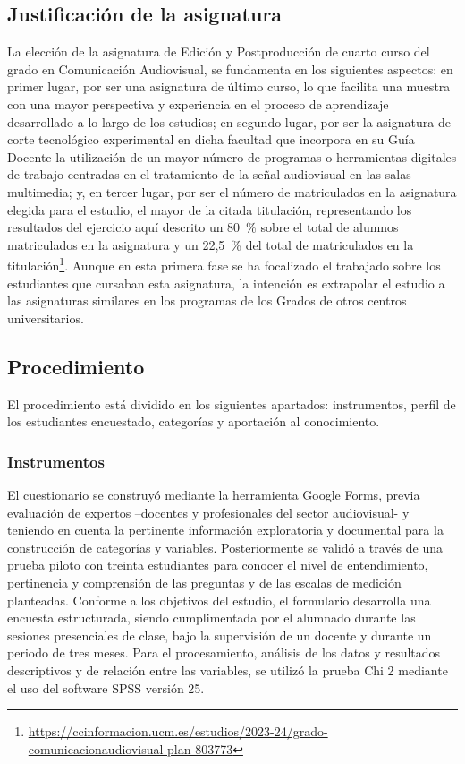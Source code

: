 \documentclass[spanish]{textolivre}
\begin{document}
\subsection{Justificación de la asignatura}\label{sec-fmt-manuscrito}
La elección de la asignatura de Edición y Postproducción de cuarto curso del grado en Comunicación Audiovisual, se fundamenta en los siguientes aspectos: en primer lugar, por ser una asignatura de último curso, lo que facilita una muestra con una mayor perspectiva y experiencia en el proceso de aprendizaje desarrollado a lo largo de los estudios; en segundo lugar, por ser la asignatura de corte tecnológico experimental en dicha facultad que incorpora en su Guía Docente la utilización de un mayor número de programas o herramientas digitales de trabajo centradas en el tratamiento de la señal audiovisual en las salas multimedia; y, en tercer lugar, por ser el número de matriculados en la asignatura elegida para el estudio, el mayor de la citada titulación, representando los resultados del ejercicio aquí descrito un 80~\% sobre el total de alumnos matriculados en la asignatura y un 22,5~\% del total de matriculados en la titulación\footnote{\url{https://ccinformacion.ucm.es/estudios/2023-24/grado-comunicacionaudiovisual-plan-803773}}. Aunque en esta primera fase se ha focalizado el trabajado sobre los estudiantes que cursaban esta asignatura, la intención es extrapolar el estudio a las asignaturas similares en los programas de los Grados de otros centros universitarios.


\subsection{Procedimiento}\label{sec-formato}
El procedimiento está dividido en los siguientes apartados: instrumentos, perfil de los estudiantes encuestado, categorías y aportación al conocimiento. 


\subsubsection{Instrumentos}\label{sec-modelo}
El cuestionario se construyó mediante la herramienta Google Forms, previa evaluación de expertos –docentes y profesionales del sector audiovisual- y teniendo en cuenta la pertinente información exploratoria y documental para la construcción de categorías y variables. Posteriormente se validó a través de una prueba piloto con treinta estudiantes para conocer el nivel de entendimiento, pertinencia y comprensión de las preguntas y de las escalas de medición planteadas. Conforme a los objetivos del estudio, el formulario desarrolla una encuesta estructurada, siendo cumplimentada por el alumnado durante las sesiones presenciales de clase, bajo la supervisión de un docente y durante un periodo de tres meses. Para el procesamiento, análisis de los datos y resultados descriptivos y de relación entre las variables, se utilizó la prueba Chi 2 mediante el uso del software SPSS versión 25.
\end{document}
